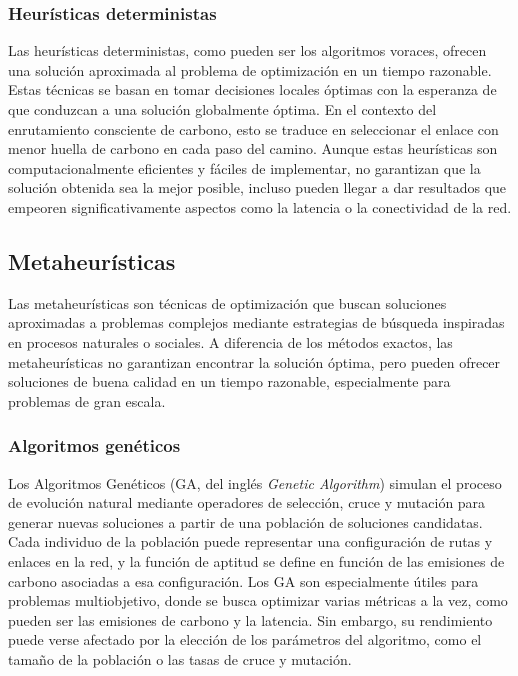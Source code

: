 \subsubsection{Heurísticas deterministas}

Las heurísticas deterministas, como pueden ser los algoritmos voraces, ofrecen una solución aproximada al problema de optimización en un tiempo razonable. Estas técnicas se basan en tomar decisiones locales óptimas con la esperanza de que conduzcan a una solución globalmente óptima. En el contexto del enrutamiento consciente de carbono, esto se traduce en seleccionar el enlace con menor huella de carbono en cada paso del camino. Aunque estas heurísticas son computacionalmente eficientes y fáciles de implementar, no garantizan que la solución obtenida sea la mejor posible, incluso pueden llegar a dar resultados que empeoren significativamente aspectos como la latencia o la conectividad de la red.

\subsection{Metaheurísticas}

Las metaheurísticas son técnicas de optimización que buscan soluciones aproximadas a problemas complejos mediante estrategias de búsqueda inspiradas en procesos naturales o sociales. A diferencia de los métodos exactos, las metaheurísticas no garantizan encontrar la solución óptima, pero pueden ofrecer soluciones de buena calidad en un tiempo razonable, especialmente para problemas de gran escala.

\subsubsection{Algoritmos genéticos}

Los Algoritmos Genéticos (GA, del inglés \textit{Genetic Algorithm}) simulan el proceso de evolución natural mediante operadores de selección, cruce y mutación para generar nuevas soluciones a partir de una población de soluciones candidatas. Cada individuo de la población puede representar una configuración de rutas y enlaces en la red, y la función de aptitud se define en función de las emisiones de carbono asociadas a esa configuración. Los GA son especialmente útiles para problemas multiobjetivo, donde se busca optimizar varias métricas a la vez, como pueden ser las emisiones de carbono y la latencia. Sin embargo, su rendimiento puede verse afectado por la elección de los parámetros del algoritmo, como el tamaño de la población o las tasas de cruce y mutación.

